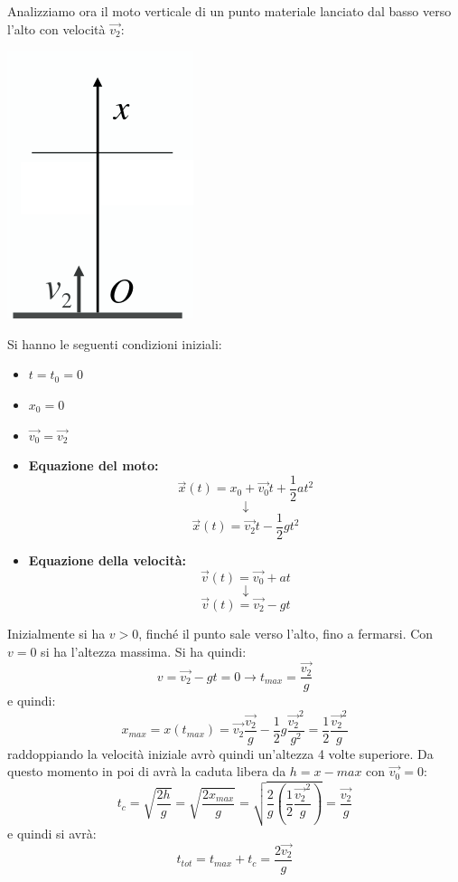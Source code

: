 \documentclass[a4paper,12pt, oneside]{book}
\begin{document}
Analizziamo ora il moto verticale di un punto materiale lanciato dal basso verso l'alto con velocità $\vec{v_2}$:
\begin{center}
	\includegraphics[scale=0.4]{img/vert3.png}
\end{center}
Si hanno le seguenti condizioni iniziali:
\begin{itemize}
	\item $t=t_0=0$
	\item $x_0=0$
	\item $\vec{v_0}=\vec{v_2}$
\end{itemize}
\begin{itemize}
	\item \textbf{Equazione del moto:}
	      $$\vec{x}(t)=x_0+\vec{v_0} t+\frac{1}{2} a  t^2$$
	      $$\downarrow$$
	      $$\vec{x}(t)=\vec{v_2}t-\frac{1}{2} g t^2$$
	\item \textbf{Equazione della velocità:}
	      $$\vec{v}(t)=\vec{v_0}+a t$$
	      $$\downarrow$$
	      $$\vec{v}(t)=\vec{v_2}-gt$$
\end{itemize}
Inizialmente si ha $v>0$, finché il punto sale verso l'alto, fino a fermarsi. Con $v=0$ si ha l'altezza massima. Si ha quindi:
$$v=\vec{v_2}-gt=0\rightarrow t_{max}=\frac{\vec{v_2}}{g}$$
e quindi:
$$x_{max}=x(t_{max})=\vec{v_2}\frac{\vec{v_2}}{g}-\frac{1}{2}g\frac{\vec{v_2}^2}{g^2}=\frac{1}{2}\frac{\vec{v_2}^2}{g}$$
raddoppiando la velocità iniziale avrò quindi un'altezza 4 volte superiore. Da questo momento in poi di avrà la caduta libera da $h=x-max$ con $\vec{v_0}=0$:
$$t_c=\sqrt{\frac{2h}{g}}=\sqrt{\frac{2x_{max}}{g}}=\sqrt{\frac{2}{g}\left(\frac{1}{2}\frac{\vec{v_2}^2}{g}\right)}=\frac{\vec{v_2}}{g}$$
e quindi si avrà:
$$t_{tot}=t_{max}+t_c=\frac{2\vec{v_2}}{g}$$
\end{document}
